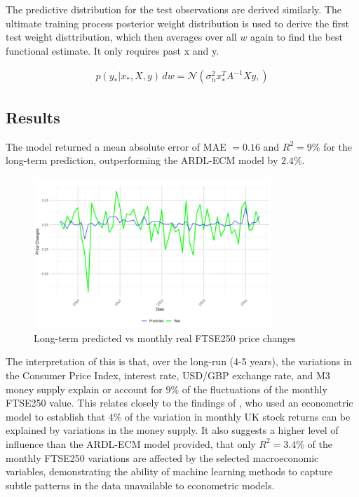 \documentclass[11pt,a4paper]{article}
\newcommand{\citeboth}[1]{\citeauthor{#1} \citep{#1}}
\begin{document}
The predictive distribution for the test observations are derived similarly. The 
ultimate training process posterior weight distribution is used to derive the 
first test weight disttribution, which then averages over all $w$ again to find the
best functional estimate. It only requires past x and y.

\begin{align}
    p(y_{*}|x_{*}, X, y) \, dw = \mathcal{N}(\sigma_{n}^{2} x_{*}^{T}A^{-1}Xy, )
\end{align}


\subsection{Results}

The model returned a mean absolute error of MAE $=0.16$ and 
$R^2 = 9\%$ for the long-term prediction, outperforming the ARDL-ECM model by 
$2.4\%$.


\begin{figure}[h]
    \centering
    \includegraphics[width=0.8\textwidth]{long-term-monthly.png}
    \caption{Long-term predicted vs monthly real FTSE250 price changes}
    \label{fig:lmonthly}
\end{figure}

The interpretation of this is that, over the long-run (4-5 years), the variations in the 
Consumer Price Index, interest rate, USD/GBP exchange rate, and M3 money 
supply explain or account for $9\%$ of the fluctuations of the
monthly FTSE250 value. This relates closely to the findings of \citeboth{conover1999}, 
who used an econometric model to establish that $4\%$ of the variation in monthly UK stock returns can be 
explained by variations in the money supply. It also suggests a higher level of influence 
than the ARDL-ECM model provided, that only $R^2=3.4\%$ of the monthly FTSE250 variations 
are affected by the selected macroeconomic variables, demonstrating the ability of machine learning
methods to capture subtle patterns in the data unavailable to econometric models. 
\end{document}
